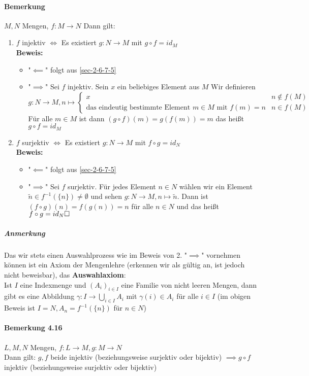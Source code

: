 \documentclass[a4paper]{scrartcl}
\theoremstyle{definition}
\theoremstyle{plain}
\theoremstyle{plain}
\theoremstyle{remark}
\theoremstyle{remark}
\theoremstyle{remark}
\theoremstyle{remark}
\theoremstyle{remark}
\begin{document}
\paragraph{Bemerkung}
\label{sec-2-6-7-7}
$M,N$ Mengen, $f:M\to N$ Dann gilt:
\begin{enumerate}
\item $f$ injektiv $\iff$ Es existiert $g:N\to M$ mit $g\circ f = id_M$ \\
                \textbf{Beweis:}
\begin{itemize}
\item "$\impliedby$" folgt aus \ref{sec-2-6-7-5}
\item "$\implies$" Sei $f$ injektiv. Sein $x$ ein beliebiges Element aus $M$
                  Wir definieren \[g:N\to M,n\mapsto \begin{cases} x & n\not\in f(M) \\ \text{das eindeutig bestimmte Element $m\in M$ mit $f(m) = n$} & n\in f(M) \end{cases}\]
                  Für alle $m\in M$ ist dann $(g\circ f)(m) = g(f(m)) = m$ das heißt $g\circ f = id_M$
\end{itemize}
\item $f$ surjektiv $\iff$ Es existiert $g:N\to M$ mit $f\circ g = id_N$ \\
                \textbf{Beweis:}
\begin{itemize}
\item "$\impliedby$" folgt aus \ref{sec-2-6-7-5}
\item "$\implies$" Sei $f$ surjektiv. Für jedes Element $n\in N$ wählen wir ein Element $\tilde n\in f^{-1}(\{n\}) \neq \emptyset$ und sehen
$g:N\to M,n\mapsto \tilde n$. Dann ist $(f\circ g)(n) = f(g(n)) = n$ für alle $n\in N$ und das heißt $f\circ g = id_N \hfill\square$
\end{itemize}
\end{enumerate}
\subparagraph{Anmerkung}
\label{sec-2-6-7-7-1}
Das wir stets einen Auswahlprozess wie im Beweis von 2. "$\implies$" vornehmen können ist ein Axiom der Mengenlehre (erkennen wir als gültig an, ist jedoch nicht beweisbar), das \textbf{Auswahlaxiom}: \\
          Ist $I$ eine Indexmenge und $(A_i)_{i\in I}$ eine Familie von nicht leeren Mengen, dann gibt es eine Abbildung $\gamma:I\to \bigcup_{i\in I} A_i$ mit $\gamma (i) \in A_i$ für alle $i\in I$ (im obigen Beweis ist $I = N,A_n = f^{-1}(\{n\})$ für $n\in N$)
\paragraph{Bemerkung 4.16}
\label{sec-2-6-7-8}
$L,M,N$ Mengen, $f:L\to M, g:M\to N$ \\
         Dann gilt: $g,f$ beide injektiv (beziehungsweise surjektiv oder bijektiv) $\implies g\circ f$ injektiv (beziehungsweise surjektiv oder bijektiv)
\end{document}
